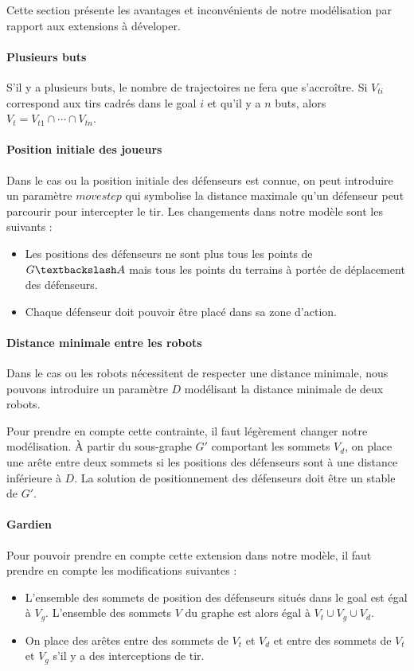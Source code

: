 \documentclass[12pt]{article}
\begin{document}
Cette section présente les avantages et inconvénients de notre modélisation par rapport aux extensions à déveloper.

\paragraph{Plusieurs buts}
S'il y a plusieurs buts, le nombre de trajectoires ne fera que s'accroître. Si $V_{ti}$ correspond aux tirs cadrés dans le goal $i$ et qu'il y a $n$ buts, alors $V_t = V_{t1} \cap \cdots \cap V_{tn}$.


\paragraph{Position initiale des joueurs}
Dans le cas ou la position initiale des défenseurs est connue, on peut introduire un paramètre $movestep$ qui symbolise la distance maximale qu'un défenseur peut parcourir pour intercepter le tir. Les changements dans notre modèle sont les suivants :

\begin{itemize}
  \item Les positions des défenseurs ne sont plus tous les points de $G \textbackslash A$ mais tous les points du terrains à portée de déplacement des défenseurs.
  \item Chaque défenseur doit pouvoir être placé dans sa zone d'action.
\end{itemize}

\paragraph{Distance minimale entre les robots}
Dans le cas ou les robots nécessitent de respecter une distance minimale, nous pouvons introduire un paramètre $D$ modélisant la distance minimale de deux robots.

Pour prendre en compte cette contrainte, il faut légèrement changer notre modélisation. À partir du sous-graphe $G'$ comportant les sommets $V_d$, on place une arête entre deux sommets si les positions des défenseurs sont à une distance inférieure à $D$. La solution de positionnement des défenseurs doit être un stable de $G'$.



\paragraph{Gardien}
Pour pouvoir prendre en compte cette extension dans notre modèle, il faut prendre en compte les modifications suivantes :
\begin{itemize}
  \item L'ensemble des sommets de position des défenseurs situés dans le goal est égal à $V_g$. L'ensemble des sommets $V$ du graphe est alors égal à $V_t \cup V_g \cup V_d$.
  \item On place des arêtes entre des sommets de $V_t$ et $V_d$ et entre des sommets de $V_t$ et $V_g$ s'il y a des interceptions de tir.
\end{itemize}
\end{document}
